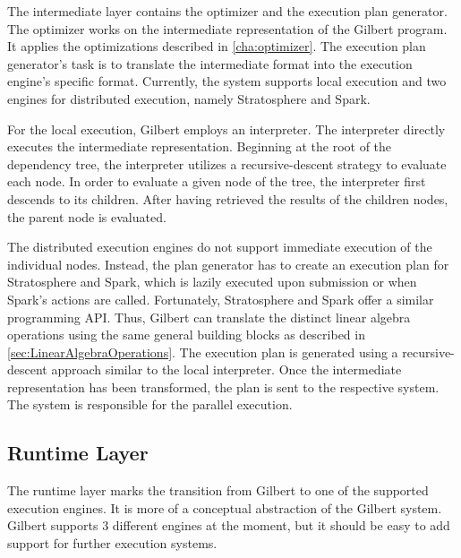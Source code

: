 The intermediate layer contains the optimizer and the execution plan generator.
The optimizer works on the intermediate representation of the Gilbert program.
It applies the optimizations described in \cref{cha:optimizer}.
The execution plan generator's task is to translate the intermediate format into the execution engine's specific format.
Currently, the system supports local execution and two engines for distributed execution, namely Stratosphere and Spark.

For the local execution, Gilbert employs an interpreter.
The interpreter directly executes the intermediate representation.
Beginning at the root of the dependency tree, the interpreter utilizes a recursive-descent strategy to evaluate each node.
In order to evaluate a given node of the tree, the interpreter first descends to its children.
After having retrieved the results of the children nodes, the parent node is evaluated.

The distributed execution engines do not support immediate execution of the individual nodes.
Instead, the plan generator has to create an execution plan for Stratosphere and Spark, which is lazily executed upon submission or when Spark's actions are called.
Fortunately, Stratosphere and Spark offer a similar programming API.
Thus, Gilbert can translate the distinct linear algebra operations using the same general building blocks as described in \cref{sec:LinearAlgebraOperations}.
The execution plan is generated using a recursive-descent approach similar to the local interpreter.
Once the intermediate representation has been transformed, the plan is sent to the respective system.
The system is responsible for the parallel execution.

\subsection{Runtime Layer}

The runtime layer marks the transition from Gilbert to one of the supported execution engines.
It is more of a conceptual abstraction of the Gilbert system.
Gilbert supports 3 different engines at the moment, but it should be easy to add support for further execution systems.
